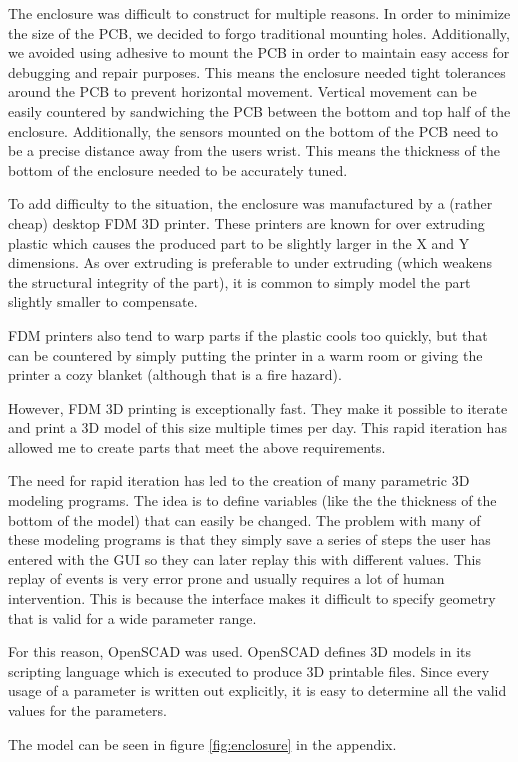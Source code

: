 
The enclosure was difficult to construct for multiple reasons.  In order to
minimize the size of the PCB, we decided to forgo traditional mounting holes.
Additionally, we avoided using adhesive to mount the PCB in order to maintain
easy access for debugging and repair purposes.  This means the enclosure needed
tight tolerances around the PCB to prevent horizontal movement.  Vertical
movement can be easily countered by sandwiching the PCB between the bottom and
top half of the enclosure.  Additionally, the sensors mounted on the bottom of
the PCB need to be a precise distance away from the users wrist.  This means
the thickness of the bottom of the enclosure needed to be accurately tuned.

To add difficulty to the situation, the enclosure was manufactured by a (rather
cheap) desktop FDM 3D printer.  These printers are known for over extruding
plastic which causes the produced part to be slightly larger in the X and Y
dimensions.  As over extruding is preferable to under extruding (which weakens
the structural integrity of the part), it is common to simply model the part
slightly smaller to compensate.

FDM printers also tend to warp parts if the plastic cools too quickly, but that
can be countered by simply putting the printer in a warm room or giving the
printer a cozy blanket (although that is a fire hazard).

However, FDM 3D printing is exceptionally fast.  They make it possible to
iterate and print a 3D model of this size multiple times per day.  This rapid
iteration has allowed me to create parts that meet the above requirements.

The need for rapid iteration has led to the creation of many parametric 3D
modeling programs.  The idea is to define variables (like the the thickness of
the bottom of the model) that can easily be changed.  The problem with many of
these modeling programs is that they simply save a series of steps the user has
entered with the GUI so they can later replay this with different values.  This
replay of events is very error prone and usually requires a lot of human
intervention.  This is because the interface makes it difficult to specify
geometry that is valid for a wide parameter range.

For this reason, OpenSCAD was used.  OpenSCAD defines 3D models in its
scripting language which is executed to produce 3D printable files.  Since
every usage of a parameter is written out explicitly, it is easy to determine
all the valid values for the parameters.

The model can be seen in figure \ref{fig:enclosure} in the appendix.

